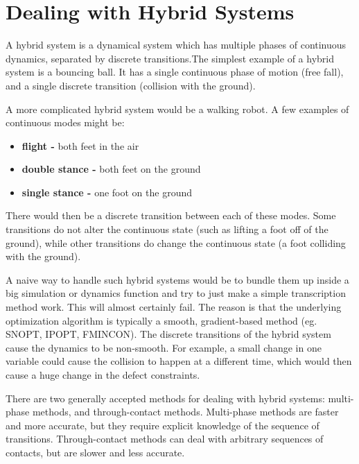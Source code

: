 \section{Dealing with Hybrid Systems} \label{sec:HybridSystems}

A hybrid system is a dynamical system which has multiple phases of continuous dynamics, separated by discrete transitions.The simplest example of a hybrid system is a bouncing ball. It has a single continuous phase of motion (free fall), and a single discrete transition (collision with the ground). 

\par A more complicated hybrid system would be a walking robot. A few examples of continuous modes might be:

\begin{itemize} \setlength{\itemsep}{-4pt}%
    \item {\bf flight - } both feet in the air
    \item {\bf double stance - } both feet on the ground
    \item {\bf single stance - } one foot on the ground
\end{itemize}

There would then be a discrete transition between each of these modes. Some transitions do not alter the continuous state (such as lifting a foot off of the ground), while other transitions do change the continuous state (a foot colliding with the ground).

\par A naive way to handle such hybrid systems would be to bundle them up inside a big simulation or dynamics function and try to just make a simple transcription method work. This will almost certainly fail. The reason is that the underlying optimization algorithm is typically a smooth, gradient-based method (eg. SNOPT, IPOPT, FMINCON). The discrete transitions of the hybrid system cause the dynamics to be non-smooth. For example, a small change in one variable could cause the collision to happen at a different time, which would then cause a huge change in the defect constraints.

\par There are two generally accepted methods for dealing with hybrid systems: multi-phase methods, and through-contact methods. Multi-phase methods are faster and more accurate, but they require explicit knowledge of the sequence of transitions. Through-contact methods can deal with arbitrary sequences of contacts, but are slower and less accurate.

